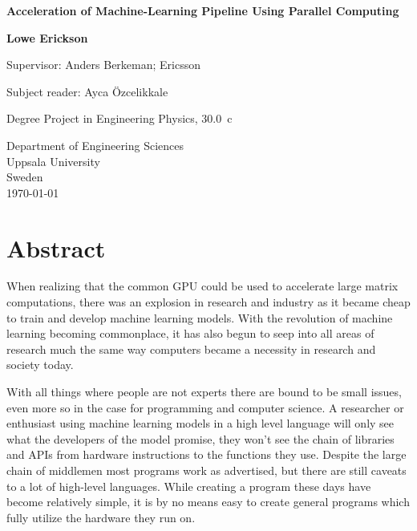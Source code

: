 \documentclass[12pt, a4paper]{article}
\title{}
\author{Lowe Erickson }
\date{May 2018}
\begin{document}
\begin{titlepage}
   \begin{center}
        \vspace*{1cm}
        \Huge
        \textbf{Acceleration of
        Machine-Learning Pipeline Using Parallel Computing}
 
        \LARGE
        \vspace{1cm}
       
        \textbf{Lowe Erickson}
 
        \vfill
        
        Supervisor: Anders Berkeman; Ericsson

        \vspace{0.5cm}
        
        Subject reader: Ayca Özcelikkale
        
        \vspace{0.5cm}

        Degree Project in Engineering Physics, \SI{30.0}{c}
 
        \vspace{0.8cm}
 
 
        Department of Engineering Sciences\\
        \vspace{0.2cm}
        Uppsala University\\
        \vspace{0.2cm}
        Sweden\\
        \vspace{0.2cm}
        \today
   \end{center}
\end{titlepage}



\section*{Abstract}
When realizing that the common GPU could be used to accelerate large matrix computations, there was an explosion in research and industry as it became cheap to train and develop machine learning models.
With the revolution of machine learning becoming commonplace, it has also begun to seep into all areas of research much the same way computers became a necessity in research and society today. \par

With all things where people are not experts there are bound to be small issues, even more so in the case for programming and computer science.
A researcher or enthusiast using machine learning models in a high level language will only see what the developers of the model promise, they won't see the chain of libraries and APIs from hardware instructions to the functions they use.
Despite the large chain of middlemen most programs work as advertised, but there are still caveats to a lot of high-level languages. 
While creating a program these days have become relatively simple, it is by no means easy to create general programs which fully utilize the hardware they run on. \par
\end{document}
